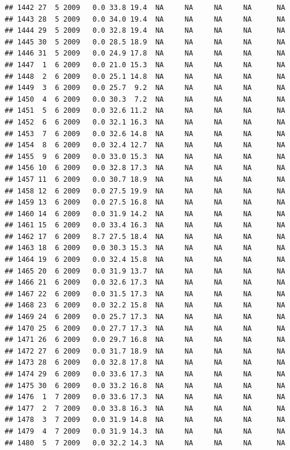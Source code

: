 \documentclass[
]{book}
\begin{document}
\begin{verbatim}
## 1442 27  5 2009   0.0 33.8 19.4  NA     NA     NA     NA      NA
## 1443 28  5 2009   0.0 34.0 19.4  NA     NA     NA     NA      NA
## 1444 29  5 2009   0.0 32.8 19.4  NA     NA     NA     NA      NA
## 1445 30  5 2009   0.0 28.5 18.9  NA     NA     NA     NA      NA
## 1446 31  5 2009   0.0 24.9 17.8  NA     NA     NA     NA      NA
## 1447  1  6 2009   0.0 21.0 15.3  NA     NA     NA     NA      NA
## 1448  2  6 2009   0.0 25.1 14.8  NA     NA     NA     NA      NA
## 1449  3  6 2009   0.0 25.7  9.2  NA     NA     NA     NA      NA
## 1450  4  6 2009   0.0 30.3  7.2  NA     NA     NA     NA      NA
## 1451  5  6 2009   0.0 32.6 11.2  NA     NA     NA     NA      NA
## 1452  6  6 2009   0.0 32.1 16.3  NA     NA     NA     NA      NA
## 1453  7  6 2009   0.0 32.6 14.8  NA     NA     NA     NA      NA
## 1454  8  6 2009   0.0 32.4 12.7  NA     NA     NA     NA      NA
## 1455  9  6 2009   0.0 33.0 15.3  NA     NA     NA     NA      NA
## 1456 10  6 2009   0.0 32.8 17.3  NA     NA     NA     NA      NA
## 1457 11  6 2009   0.0 30.7 18.9  NA     NA     NA     NA      NA
## 1458 12  6 2009   0.0 27.5 19.9  NA     NA     NA     NA      NA
## 1459 13  6 2009   0.0 27.5 16.8  NA     NA     NA     NA      NA
## 1460 14  6 2009   0.0 31.9 14.2  NA     NA     NA     NA      NA
## 1461 15  6 2009   0.0 33.4 16.3  NA     NA     NA     NA      NA
## 1462 17  6 2009   8.7 27.5 18.4  NA     NA     NA     NA      NA
## 1463 18  6 2009   0.0 30.3 15.3  NA     NA     NA     NA      NA
## 1464 19  6 2009   0.0 32.4 15.8  NA     NA     NA     NA      NA
## 1465 20  6 2009   0.0 31.9 13.7  NA     NA     NA     NA      NA
## 1466 21  6 2009   0.0 32.6 17.3  NA     NA     NA     NA      NA
## 1467 22  6 2009   0.0 31.5 17.3  NA     NA     NA     NA      NA
## 1468 23  6 2009   0.0 32.2 15.8  NA     NA     NA     NA      NA
## 1469 24  6 2009   0.0 25.7 17.3  NA     NA     NA     NA      NA
## 1470 25  6 2009   0.0 27.7 17.3  NA     NA     NA     NA      NA
## 1471 26  6 2009   0.0 29.7 16.8  NA     NA     NA     NA      NA
## 1472 27  6 2009   0.0 31.7 18.9  NA     NA     NA     NA      NA
## 1473 28  6 2009   0.0 32.8 17.8  NA     NA     NA     NA      NA
## 1474 29  6 2009   0.0 33.6 17.3  NA     NA     NA     NA      NA
## 1475 30  6 2009   0.0 33.2 16.8  NA     NA     NA     NA      NA
## 1476  1  7 2009   0.0 33.6 17.3  NA     NA     NA     NA      NA
## 1477  2  7 2009   0.0 33.8 16.3  NA     NA     NA     NA      NA
## 1478  3  7 2009   0.0 31.9 14.8  NA     NA     NA     NA      NA
## 1479  4  7 2009   0.0 31.9 14.3  NA     NA     NA     NA      NA
## 1480  5  7 2009   0.0 32.2 14.3  NA     NA     NA     NA      NA

\end{verbatim}
\end{document}
